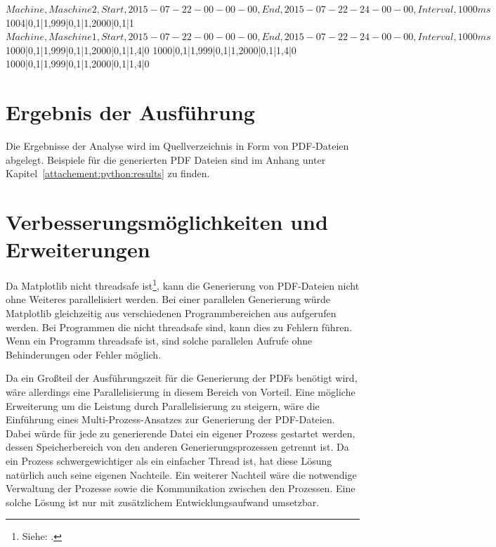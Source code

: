 \begin{MetadataExample}
$Machine,Maschine2,Start,2015-07-22-00-00-00,End,2015-07-22-24-00-00,Interval,1000ms$
1004|0,1|1,999|0,1|1,2000|0,1|1
$Machine,Maschine1,Start,2015-07-22-00-00-00,End,2015-07-22-24-00-00,Interval,1000ms$
1000|0,1|1,999|0,1|1,2000|0,1|1,4|0
1000|0,1|1,999|0,1|1,2000|0,1|1,4|0
1000|0,1|1,999|0,1|1,2000|0,1|1,4|0	
\end{MetadataExample}


\section{Ergebnis der Ausführung}
Die Ergebnisse der Analyse wird im Quellverzeichnis in Form von PDF-Dateien abgelegt.
Beispiele für die generierten PDF Dateien sind im Anhang unter Kapitel~\ref{attachement:python:results} zu finden.

\section{Verbesserungsmöglichkeiten und Erweiterungen}
Da Matplotlib nicht threadsafe ist\footnote{ Siehe: \cite{Stackoverflow2016}.}, kann die Generierung von PDF-Dateien nicht ohne Weiteres parallelisiert werden.
Bei einer parallelen Generierung würde Matplotlib gleichzeitig aus verschiedenen Programmbereichen aus aufgerufen werden.
Bei Programmen die nicht threadsafe sind, kann dies zu Fehlern führen.
Wenn ein Programm threadsafe ist, sind solche parallelen Aufrufe ohne Behinderungen oder Fehler möglich.

Da ein Großteil der Ausführungszeit für die Generierung der PDFs benötigt wird, wäre allerdings eine Parallelisierung in diesem Bereich von Vorteil.
Eine mögliche Erweiterung um die Leistung durch Parallelisierung zu steigern, wäre die Einführung eines Multi-Prozess-Ansatzes zur Generierung der PDF-Dateien.
Dabei würde für jede zu generierende Datei ein eigener Prozess gestartet werden, dessen Speicherbereich von den anderen Generierungsprozessen getrennt ist.
Da ein Prozess schwergewichtiger als ein einfacher Thread ist, hat diese Lösung natürlich auch seine eigenen Nachteile.
Ein weiterer Nachteil wäre die notwendige Verwaltung der Prozesse sowie die Kommunikation zwischen den Prozessen.
Eine solche Lösung ist nur mit zusätzlichem Entwicklungsaufwand umsetzbar.